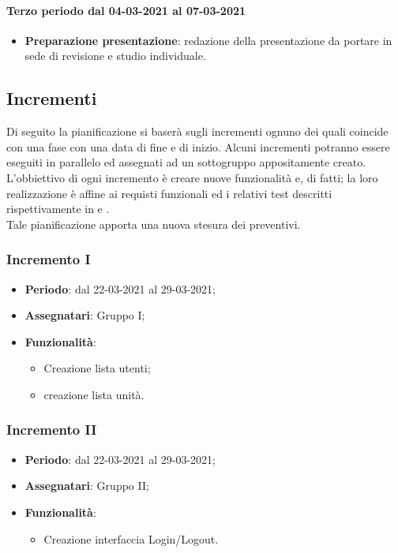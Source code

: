 \paragraph{Terzo periodo dal 04-03-2021 al 07-03-2021}
\begin{itemize}
	\item \textbf{Preparazione presentazione}: redazione della presentazione da portare in sede di revisione e
	studio individuale.
\end{itemize}

\newpage
 \newpage

 \subsection{Incrementi}
 Di seguito la pianificazione si baserà sugli incrementi ognuno dei quali coincide con una fase con una data di fine e di inizio. Alcuni incrementi potranno essere eseguiti in parallelo ed assegnati ad un sottogruppo appositamente creato. \\
  L'obbiettivo di ogni incremento è creare nuove funzionalità e, di fatti; la loro realizzazione è affine ai requisti funzionali ed i relativi test descritti rispettivamente in  e .\\
 Tale pianificazione apporta una nuova stesura dei preventivi.

 \subsubsection{Incremento I}
  \begin{itemize}
  	\item \textbf{Periodo}: dal 22-03-2021 al 29-03-2021;
  	\item \textbf{Assegnatari}: Gruppo I;
  	\item \textbf{Funzionalità}:
  		\begin{itemize}
  		\item Creazione lista utenti;
  		\item creazione lista unità.
  	    \end{itemize}
  \end{itemize}

 \subsubsection{Incremento II}
 \begin{itemize}
 	\item \textbf{Periodo}: dal 22-03-2021 al 29-03-2021;
 	\item \textbf{Assegnatari}: Gruppo II;
 	\item \textbf{Funzionalità}:
 	\begin{itemize}
 		\item Creazione interfaccia Login/Logout.
 	\end{itemize}
 \end{itemize}

